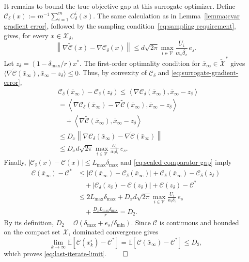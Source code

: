 \documentclass[twocolumn]{autart}    %
\newcommand{\order}[1]{\mathcal{O}\left(#1\right)}
\newcommand{\brk}[1]{\left[#1\right]}
\newcommand{\1}{\mathbf{1}}
\begin{document}
It remains to bound the true-objective gap at this surrogate optimizer. Define $\mathcal C_\delta(x):=m^{-1}\sum_{i=1}^mC_\delta^i(x)$. The same calculation as in Lemma~\ref{lemma:cvar gradient error}, followed by the sampling condition~\eqref{eq:sampling requirement}, gives, for every $x\in\mathcal X_\delta$,
\begin{equation}\label{eq:surrogate-gradient-error}
\left\|\nabla\widetilde{\mathcal C}(x)
-\nabla\mathcal C_\delta(x)\right\|
\leq   d\sqrt{2\pi }
\max_{i\in\mathcal V}\frac{U_i}{\alpha_i\delta_i}\,e_s.
\end{equation}
Let $z_\delta=(1-\delta_{\max}/r)x^\ast$. The first-order optimality condition for $\bar x_\infty\in\widetilde{\mathcal X}^{\ast}$ gives
$\langle\nabla\widetilde{\mathcal C}(\bar x_\infty),
\bar x_\infty-z_\delta\rangle\leq0$. Thus, by convexity of $\mathcal C_\delta$ and \eqref{eq:surrogate-gradient-error},
\begin{align*}
&\mathcal C_\delta(\bar x_\infty)-\mathcal C_\delta(z_\delta)
\leq\left\langle\nabla\mathcal C_\delta(\bar x_\infty),
\bar x_\infty-z_\delta\right\rangle\\
&=\left\langle\nabla\mathcal C_\delta(\bar x_\infty)
-\nabla\widetilde{\mathcal C}(\bar x_\infty),
\bar x_\infty-z_\delta\right\rangle\\
&\quad+\left\langle\nabla\widetilde{\mathcal C}(\bar x_\infty),
\bar x_\infty-z_\delta\right\rangle\\
&\leq D_x\left\|\nabla\mathcal C_\delta(\bar x_\infty)
-\nabla\widetilde{\mathcal C}(\bar x_\infty)\right\|\\
&\leq   D_xd\sqrt{ 2\pi } 
\max_{i\in\mathcal V}\frac{U_i}{\alpha_i\delta_i}\,e_s.
\end{align*}
Finally, $|\mathcal C_\delta(x)-\mathcal C(x)|\leq L_{\max}\delta_{\max}$ and \eqref{eq:scaled-comparator-gap} imply
\begin{align}
\mathcal C(\bar x_\infty)-\mathcal C^\ast
&\leq\left|\mathcal C(\bar x_\infty)-\mathcal C_\delta(\bar x_\infty)\right|
+\mathcal C_\delta(\bar x_\infty)-\mathcal C_\delta(z_\delta)\nonumber\\
&\quad+\left|\mathcal C_\delta(z_\delta)-\mathcal C(z_\delta)\right|
+\mathcal C(z_\delta)-\mathcal C^\ast\nonumber\\
&\leq2L_{\max}\delta_{\max}
+  D_xd\sqrt{2\pi } 
\max_{i\in\mathcal V}\frac{U_i}{\alpha_i\delta_i}\,e_s\nonumber\\
&\quad+\frac{D_xL_{\max}\delta_{\max}}{r}
=D_2.
\label{eq:last-iterate-true-gap}
\end{align}
By its definition, $D_2=\order{\delta_{\max}+e_s/\delta_{\min}}$. Since $\mathcal C$ is continuous and bounded on the compact set $\mathcal X$, dominated convergence gives
\begin{equation*}
\lim_{k\to\infty}\mathbb E\brk{\mathcal C(x_k^i)-\mathcal C^\ast}
=\mathbb E\brk{\mathcal C(\bar x_\infty)-\mathcal C^\ast}
\leq D_2,
\end{equation*}
which proves \eqref{eq:last-iterate-limit}.
\hfill 
$\qed$
\end{document}
